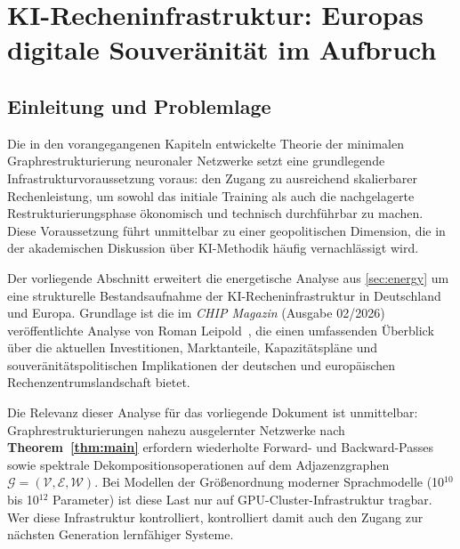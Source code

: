 ﻿\documentclass[12pt, a4paper, openany]{report}
\newcommand{\calG}{\mathcal{G}}
\newcommand{\calV}{\mathcal{V}}
\newcommand{\calE}{\mathcal{E}}
\newcommand{\calW}{\mathcal{W}}
\begin{document}
\chapter{KI-Recheninfrastruktur: Europas digitale Souveränität im Aufbruch}
\label{sec:ki_infrastruktur}

\section{Einleitung und Problemlage}

Die in den vorangegangenen Kapiteln entwickelte Theorie der minimalen
Graphrestrukturierung neuronaler Netzwerke setzt eine grundlegende
Infrastrukturvoraussetzung voraus: den Zugang zu ausreichend skalierbarer
Rechenleistung, um sowohl das initiale Training als auch die nachgelagerte
Restrukturierungsphase ökonomisch und technisch durchführbar zu machen.
Diese Voraussetzung führt unmittelbar zu einer geopolitischen Dimension, die
in der akademischen Diskussion über KI-Methodik häufig vernachlässigt wird.

Der vorliegende Abschnitt erweitert die energetische Analyse aus
\cref{sec:energy} um eine strukturelle Bestandsaufnahme der
KI-Recheninfrastruktur in Deutschland und Europa. Grundlage ist die im
\textit{CHIP Magazin} (Ausgabe 02/2026) veröffentlichte Analyse von Roman
Leipold~\cite{leipold2026chip}, die einen umfassenden Überblick über die
aktuellen Investitionen, Marktanteile, Kapazitätspläne und
souveränitätspolitischen Implikationen der deutschen und europäischen
Rechenzentrumslandschaft bietet.

Die Relevanz dieser Analyse für das vorliegende Dokument ist unmittelbar:
Graphrestrukturierungen nahezu ausgelernter Netzwerke nach
\textbf{Theorem~\ref{thm:main}} erfordern wiederholte Forward- und
Backward-Passes sowie spektrale Dekompositionsoperationen auf dem
Adjazenzgraphen $\calG = (\calV, \calE, \calW)$. Bei Modellen der Größenordnung
moderner Sprachmodelle (10$^{10}$ bis 10$^{12}$ Parameter) ist diese Last
nur auf GPU-Cluster-Infrastruktur tragbar. Wer diese Infrastruktur kontrolliert,
kontrolliert damit auch den Zugang zur nächsten Generation lernfähiger Systeme.

\end{document}
